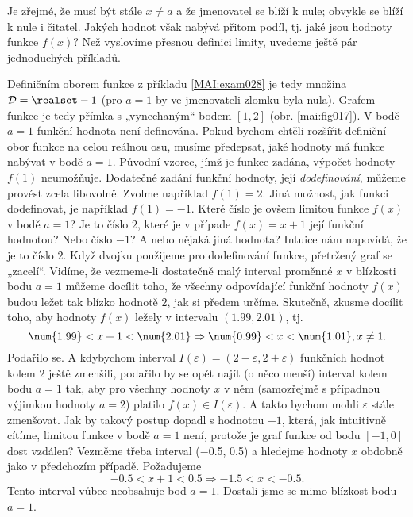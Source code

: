     Je zřejmé, že musí být stále \(x \neq a\) a že jmenovatel se blíží k nule; obvykle se blíží k
    nule i čitatel. Jakých hodnot však nabývá přitom podíl, tj. jaké jsou hodnoty funkce \(f(x)\)?
    Než vyslovíme přesnou definici limity, uvedeme ještě pár jednoduchých příkladů.

      

    Definičním oborem funkce z příkladu \ref{MAI:exam028} je tedy množina \(\mathcal{D} = \realset -
    {1}\) (pro \(a = 1\) by ve jmenovateli zlomku byla nula). Grafem funkce je tedy přímka s
    „vynechaným“ bodem \([1, 2]\) (obr. \ref{mai:fig017}). V bodě \(a = 1\) funkční hodnota není
    definována. Pokud bychom chtěli rozšířit definiční obor funkce na celou reálnou osu, musíme
    předepsat, jaké hodnoty má funkce nabývat v bodě \(a = 1\). Původní vzorec, jímž je funkce
    zadána, výpočet hodnoty \(f(1)\) neumožňuje. Dodatečné zadání funkční hodnoty, její
    \emph{dodefinování}, můžeme provést zcela libovolně. Zvolme například \(f(1) = 2\). Jiná
    možnost, jak funkci dodefinovat, je například \(f(1) =-1\). Které číslo je ovšem limitou funkce
    \(f(x)\) v bodě \(a = 1\)? Je to číslo \(2\), které je v případe \(f(x) = x+1\) její funkční
    hodnotou? Nebo číslo \(-1\)? A nebo nějaká jiná hodnota? Intuice nám napovídá, že je to číslo
    \(2\). Když dvojku použijeme pro dodefinování funkce, přetržený graf se „zacelí“. Vidíme, že
    vezmeme-li dostatečně malý interval proměnné \(x\) v blízkosti bodu \(a=1\) můžeme docílit toho,
    že všechny odpovídající funkční hodnoty \(f(x)\) budou ležet tak blízko hodnotě \(2\), jak si
    předem určíme. Skutečně, zkusme docílit toho, aby hodnoty \(f(x)\) ležely v intervalu
    \((\num{1.99}, \num{2.01})\), tj.
    \begin{equation*}
      \num{1.99} < x + 1 < \num{2.01} \Rightarrow \num{0.99} < x < \num{1.01},\hfill x\neq1.
    \end{equation*}
    Podařilo se. A kdybychom interval \(I(\varepsilon) = (2 - \varepsilon, 2 + \varepsilon)\) 
    funkčních hodnot kolem \(2\) ještě zmenšili, podařilo by se opět najít (o něco menší) interval 
    kolem bodu \(a = 1\) tak, aby pro všechny hodnoty \(x\) v něm (samozřejmě s případnou výjimkou 
    hodnoty \(a =2\)) platilo \(f(x)\in I(\varepsilon)\). A takto bychom mohli \(\varepsilon\) 
    stále zmenšovat. Jak by takový postup dopadl s hodnotou \(-1\), která, jak intuitivně cítíme, 
    limitou funkce v bodě \(a = 1\) není, protože je graf funkce od bodu \([-1,0]\) dost vzdálen? 
    Vezměme třeba interval (\num{-0.5}, \num{0.5}) a hledejme hodnoty \(x\) obdobně jako v 
    předchozím případě. Požadujeme
    \begin{equation*}
      \num{-0.5} < x + 1 < \num{0.5} \Rightarrow \num{-1.5} < x < \num{-0.5}.
    \end{equation*}
    Tento interval vůbec neobsahuje bod \(a = 1\). Dostali jsme se mimo blízkost bodu \(a = 1\).

